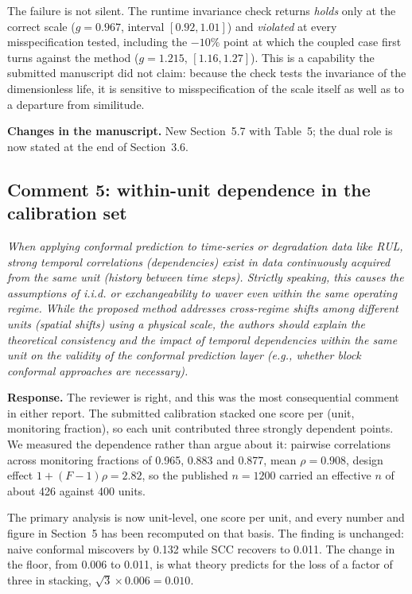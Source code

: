 \documentclass[11pt,a4paper]{article}
\newenvironment{comment}
  {\begin{list}{}{\leftmargin=6mm \rightmargin=2mm}\item[]\color{quoteline}\itshape}
  {\end{list}}
\newcommand{\where}[1]{\textbf{Changes in the manuscript.} #1}
\begin{document}
The failure is not silent. The runtime invariance check returns \emph{holds} only at the correct
scale ($g=0.967$, interval $[0.92,1.01]$) and \emph{violated} at every misspecification tested,
including the $-10\%$ point at which the coupled case first turns against the method ($g=1.215$,
$[1.16,1.27]$). This is a capability the submitted manuscript did not claim: because the check
tests the invariance of the dimensionless life, it is sensitive to misspecification of the scale
itself as well as to a departure from similitude.

\where{New Section~5.7 with Table~5; the dual role is now stated at the end of Section~3.6.}

\subsection*{Comment 5: within-unit dependence in the calibration set}
\begin{comment}
When applying conformal prediction to time-series or degradation data like RUL, strong temporal
correlations (dependencies) exist in data continuously acquired from the same unit (history between
time steps). Strictly speaking, this causes the assumptions of i.i.d. or exchangeability to waver
even within the same operating regime. While the proposed method addresses cross-regime shifts
among different units (spatial shifts) using a physical scale, the authors should explain the
theoretical consistency and the impact of temporal dependencies within the same unit on the
validity of the conformal prediction layer (e.g., whether block conformal approaches are
necessary).
\end{comment}

\noindent\textbf{Response.} The reviewer is right, and this was the most consequential comment in
either report. The submitted calibration stacked one score per (unit, monitoring fraction), so each
unit contributed three strongly dependent points. We measured the dependence rather than argue about
it: pairwise correlations across monitoring fractions of 0.965, 0.883 and 0.877, mean $\rho=0.908$,
design effect $1+(F-1)\rho=2.82$, so the published $n=1200$ carried an effective $n$ of about 426
against 400 units.

The primary analysis is now unit-level, one score per unit, and every number and figure in Section~5
has been recomputed on that basis. The finding is unchanged: naive conformal miscovers by 0.132
while SCC recovers to 0.011. The change in the floor, from 0.006 to 0.011, is what theory predicts
for the loss of a factor of three in stacking, $\sqrt3\times0.006=0.010$.
\end{document}

